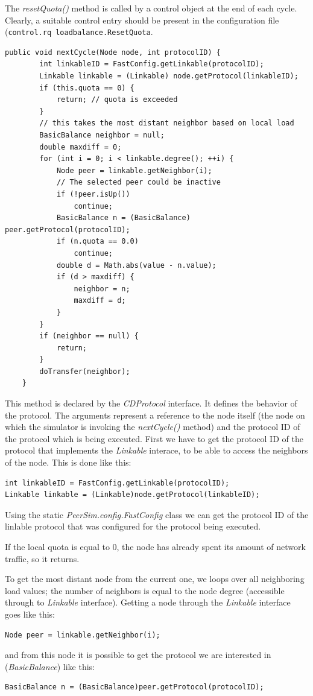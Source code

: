 \documentclass[a4paper,11pt]{article}
\begin{document}
The \emph{resetQuota()} method is called by a control object at
the end of each cycle. Clearly, a suitable control entry should be present
in the configuration file
(\texttt{control.rq loadbalance.ResetQuota}.

\footnotesize
\begin{verbatim}
public void nextCycle(Node node, int protocolID) {
        int linkableID = FastConfig.getLinkable(protocolID);
        Linkable linkable = (Linkable) node.getProtocol(linkableID);
        if (this.quota == 0) {
            return; // quota is exceeded
        }
        // this takes the most distant neighbor based on local load
        BasicBalance neighbor = null;
        double maxdiff = 0;
        for (int i = 0; i < linkable.degree(); ++i) {
            Node peer = linkable.getNeighbor(i);
            // The selected peer could be inactive
            if (!peer.isUp())
                continue;
            BasicBalance n = (BasicBalance) peer.getProtocol(protocolID);
            if (n.quota == 0.0)
                continue;
            double d = Math.abs(value - n.value);
            if (d > maxdiff) {
                neighbor = n;
                maxdiff = d;
            }
        }
        if (neighbor == null) {
            return;
        }
        doTransfer(neighbor);
    }
\end{verbatim}
\normalsize

This method is declared by the \emph{CDProtocol} interface. It defines the
behavior of the protocol. The arguments represent a reference
to the node itself (the node on which the simulator is invoking the
\emph{nextCycle()} method) and the protocol ID of the protocol
which is being executed.
First we have to get the protocol ID of
the protocol that implements the \emph{Linkable} interace, to be able
to access the neighbors of the node.
This is done like this:
\begin{verbatim}
int linkableID = FastConfig.getLinkable(protocolID);
Linkable linkable = (Linkable)node.getProtocol(linkableID);
\end{verbatim}
Using the static \emph{PeerSim.config.FastConfig} class we can get the
protocol ID of the linlable protocol that was configured for the protocol
being executed.

If the local quota is equal to 0, the node has already
spent its amount of network traffic, so it returns.

To get the most distant node from the current one, we loops over
all neighboring load values; the number of neighbors is equal to the
node degree (accessible through to \emph{Linkable} interface). Getting a node
through the \emph{Linkable} interface goes like this:
\begin{verbatim}
Node peer = linkable.getNeighbor(i);
\end{verbatim}
and from this node it is possible
to get the protocol we are interested in (\emph{BasicBalance}) like this:
\begin{verbatim}
BasicBalance n = (BasicBalance)peer.getProtocol(protocolID);
\end{verbatim}
\end{document}
